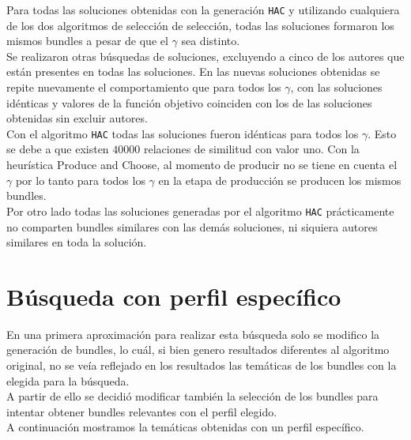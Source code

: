 Para todas las soluciones obtenidas con la generación \texttt{HAC} y utilizando cualquiera de los 
dos algoritmos de selección de selección, todas las soluciones formaron los mismos bundles a 
pesar de que el $\gamma$ sea distinto.\\ 
Se realizaron otras búsquedas de soluciones, excluyendo a cinco de los autores que están presentes 
en todas las soluciones. En las nuevas soluciones obtenidas se repite nuevamente el comportamiento 
que para todos los $\gamma$, con las soluciones idénticas y valores de la función objetivo coinciden 
con los de las soluciones obtenidas sin excluir autores.\\
Con el algoritmo \texttt{HAC} todas las soluciones fueron idénticas para todos los $\gamma$. Esto 
se debe a que existen $40000$ relaciones de similitud con valor uno. Con la heurística Produce and 
Choose, al momento de producir no se tiene en cuenta el $\gamma$ por lo tanto para todos los 
$\gamma$ en la etapa de producción se producen los mismos bundles.\\
Por otro lado todas las soluciones generadas por el algoritmo \texttt{HAC} prácticamente no 
comparten bundles similares con las demás soluciones, ni siquiera autores similares en toda la 
solución.

\section{Búsqueda con perfil específico}
En una primera aproximación para realizar esta búsqueda solo se modifico la generación de bundles, 
lo cuál, si bien genero resultados diferentes al algoritmo original, no se veía reflejado en los 
resultados las temáticas de los bundles con la elegida para la búsqueda. \\
A partir de ello se decidió modificar también la selección de los bundles para intentar obtener 
bundles relevantes con el perfil elegido. \\
A continuación mostramos la temáticas obtenidas con un perfil específico.